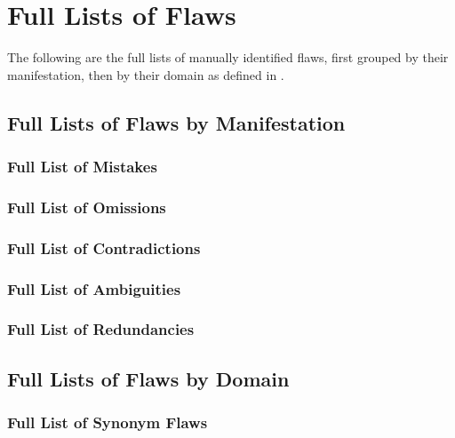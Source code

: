 \chapter{Full Lists of Flaws}\label{flaws-full}

The following are the full lists of manually identified flaws, first grouped
by their manifestation, then by their domain as defined in .

\section{Full Lists of Flaws by Manifestation}\label{flawMnfsts-full}

\subsection{Full List of Mistakes}\label{wrong-full}


\subsection{Full List of Omissions}\label{miss-full}


\subsection{Full List of Contradictions}\label{contra-full}


\subsection{Full List of Ambiguities}\label{ambi-full}


\subsection{Full List of Redundancies}\label{redun-full}


\section{Full Lists of Flaws by Domain}\label{flawDmn-full}

\subsection{Full List of Synonym Flaws}

